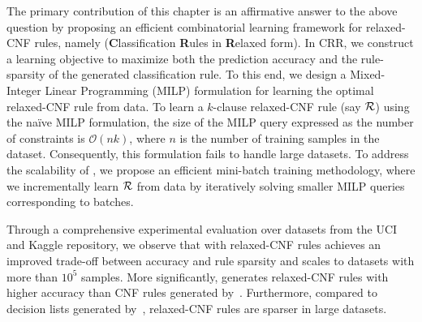 The primary contribution of this chapter is an affirmative answer to the above question by proposing an efficient combinatorial learning framework for relaxed-CNF rules, namely {\crr} (\textbf{C}lassification \textbf{R}ules in \textbf{R}elaxed form). In CRR, we construct a learning objective to maximize both the prediction accuracy and the rule-sparsity of the generated classification rule. To this end, we design a  Mixed-Integer Linear Programming (MILP) formulation for learning the optimal relaxed-CNF rule from data. To learn a $ k $-clause relaxed-CNF rule (say $ {\mathcal{R}} $) using the na\"ive MILP formulation, the size of the MILP query expressed as the number of constraints is $ \mathcal{O}(nk) $, where $ n $ is the number of training samples in the dataset. Consequently, this formulation fails to handle large datasets. To address the scalability of {\crr},  we propose an efficient mini-batch training methodology, where we incrementally learn $ {\mathcal{R}} $ from data by iteratively solving smaller MILP queries corresponding to batches. 

{Through a comprehensive experimental evaluation over datasets from the UCI and Kaggle repository, we observe that {\crr} with relaxed-CNF rules achieves an improved trade-off between accuracy and rule sparsity and scales to datasets with more than $ 10^5 $ samples. More significantly, {\crr} generates relaxed-CNF rules with higher accuracy than CNF rules generated by~\cite{GM2019}. Furthermore, compared to decision lists generated by~\cite{C1995}, relaxed-CNF rules are sparser in large datasets.}
%


